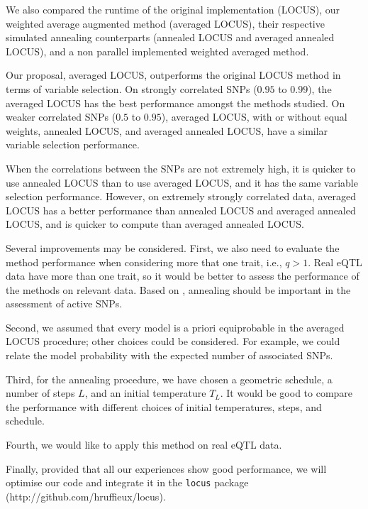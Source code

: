 \documentclass[a4paper, 11pt]{report}
\numberwithin{equation}{chapter}
\begin{document}
We also compared the runtime of the original implementation (LOCUS), our weighted average augmented method (averaged LOCUS), their respective simulated annealing counterparts (annealed LOCUS and averaged annealed LOCUS), and a non parallel implemented weighted averaged method.

Our proposal, averaged LOCUS, outperforms the original LOCUS method in terms of variable selection. On strongly correlated SNPs ($0.95$ to $0.99$), the averaged LOCUS has the best performance amongst the methods studied. On weaker correlated SNPs ($0.5$ to $0.95$), averaged LOCUS, with or without equal weights, annealed LOCUS, and averaged annealed LOCUS, have a similar variable selection performance.

When the correlations between the SNPs are not extremely high, it is quicker to use annealed LOCUS than to use averaged LOCUS, and it has the same variable selection performance. However, on extremely strongly correlated data, averaged LOCUS has a better performance than annealed LOCUS and averaged annealed LOCUS, and is quicker to compute than averaged annealed LOCUS.

Several improvements may be considered. First, we also need to evaluate the method performance when considering more that one trait, i.e., $q > 1$. Real eQTL data have more than one trait, so it would be better to assess the performance of the methods on relevant data. Based on \citet{glob_loc}, annealing should be important in the assessment of active SNPs.

Second, we assumed that every model is a priori equiprobable in the averaged LOCUS procedure; other choices could be considered. For example, we could relate the model probability with the expected number of associated SNPs.

Third, for the annealing procedure, we have chosen a geometric schedule, a number of steps $L$, and an initial temperature $T_L$. It would be good to compare the performance with different choices of initial temperatures, steps, and schedule.

Fourth, we would like to apply this method on real eQTL data.

Finally, provided that all our experiences show good performance, we will optimise our code and integrate it in the \texttt{locus} package (http://github.com/hruffieux/locus).
\newpage


\end{document}

